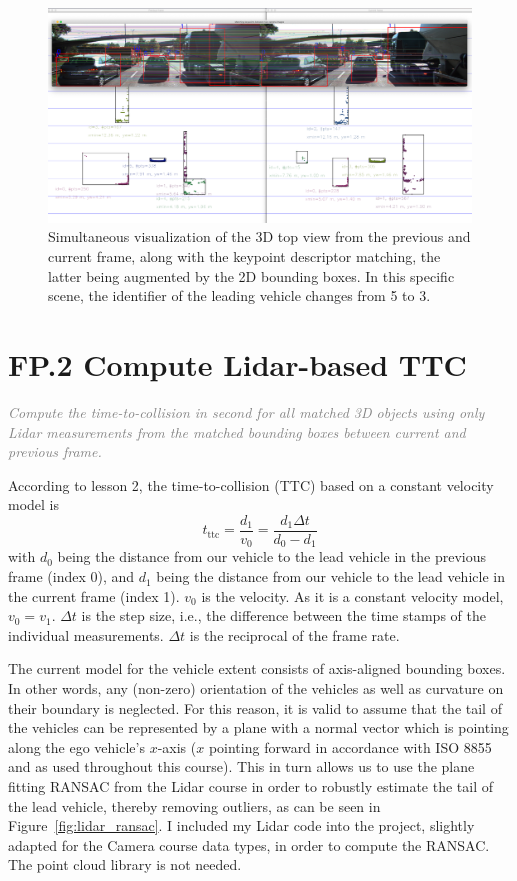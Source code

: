 \documentclass[a4paper]{scrartcl}
\begin{document}
\begin{figure}
	\centering
	\includegraphics[width=0.8\columnwidth]{./img/3D_object_matching}
	\caption{Simultaneous visualization of the 3D top view from the previous and current frame,
		along with the keypoint descriptor matching, the latter being augmented by the
		2D bounding boxes.
		In this specific scene, the identifier of the leading vehicle changes
		from 5 to 3.}
	\label{fig:matching_3d_objects}
\end{figure}

\section*{FP.2 Compute Lidar-based TTC}
\textcolor{gray}{\textit{Compute the time-to-collision in second for all matched 3D objects using only Lidar measurements from the matched bounding boxes between current and previous frame. }}

According to lesson 2, the time-to-collision (TTC) based on a constant velocity model is
\begin{equation}
\label{eqn:lidar:ttc}
	t_\text{ttc} = \frac{d_1}{v_0} = \frac{d_1 \Delta t}{d_0 - d_1}
\end{equation}
with $d_0$ being the distance from our vehicle to the lead vehicle in the previous frame (index 0),
and $d_1$ being the distance from our vehicle to the lead vehicle in the current frame (index 1).
$v_0$ is the velocity. As it is a constant velocity model, $v_0 = v_1$.
$\Delta t$ is the step size, i.e., the difference between the time stamps of
the individual measurements. $\Delta t$ is the reciprocal of the frame rate.

The current model for the vehicle extent consists of axis-aligned bounding boxes.
In other words, any (non-zero) orientation of the vehicles as well as
curvature on their boundary is neglected.
For this reason, it is valid to assume that the tail of the vehicles can be represented
by a plane with a normal vector which is pointing along the ego vehicle's $x$-axis
($x$ pointing forward in accordance with ISO 8855 and as used throughout this course).
This in turn allows us to use the plane fitting RANSAC from the Lidar course
in order to robustly estimate the tail of the lead vehicle, thereby removing outliers, as
can be seen in Figure~\ref{fig:lidar_ransac}.
I included my Lidar code into the project, slightly adapted for the Camera course data types, in order
to compute the RANSAC. The point cloud library is not needed.
\end{document}
